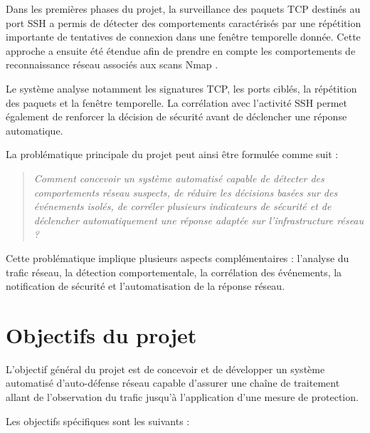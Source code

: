 Dans les premières phases du projet, la surveillance des paquets TCP destinés
au port SSH a permis de détecter des comportements caractérisés par une
répétition importante de tentatives de connexion dans une fenêtre temporelle
donnée. Cette approche a ensuite été étendue afin de prendre en compte les
comportements de reconnaissance réseau associés aux scans Nmap \cite{nmap_reference}.

Le système analyse notamment les signatures TCP, les ports ciblés, la répétition
des paquets et la fenêtre temporelle. La corrélation avec l’activité SSH permet
également de renforcer la décision de sécurité avant de déclencher une réponse
automatique.

La problématique principale du projet peut ainsi être formulée comme suit :

\begin{quote}
\textit{Comment concevoir un système automatisé capable de détecter des
comportements réseau suspects, de réduire les décisions basées sur des
événements isolés, de corréler plusieurs indicateurs de sécurité et de
déclencher automatiquement une réponse adaptée sur l’infrastructure réseau ?}
\end{quote}

Cette problématique implique plusieurs aspects complémentaires : l’analyse du
trafic réseau, la détection comportementale, la corrélation des événements,
la notification de sécurité et l’automatisation de la réponse réseau.

\section{Objectifs du projet}

L’objectif général du projet est de concevoir et de développer un système
automatisé d’auto-défense réseau capable d’assurer une chaîne de traitement
allant de l’observation du trafic jusqu’à l’application d’une mesure de
protection.

Les objectifs spécifiques sont les suivants :

